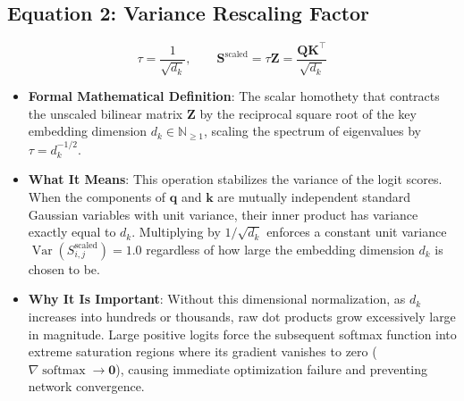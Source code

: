 \documentclass[11pt,a4paper]{article}
\theoremstyle{definition}
\begin{document}
\subsection{\textbf{Equation 2: Variance Rescaling Factor}}
{\boldmath
\begin{equation}
\tau = \frac{1}{\sqrt{d_k}}, \qquad \mathbf{S}^{\text{scaled}} = \tau \mathbf{Z} = \frac{\mathbf{Q}\mathbf{K}^\top}{\sqrt{d_k}}
\end{equation}
}
\begin{itemize}
    \item \textbf{Formal Mathematical Definition}:
    The scalar homothety that contracts the unscaled bilinear matrix $\mathbf{Z}$ by the reciprocal square root of the key embedding dimension $d_k \in \mathbb{N}_{\ge 1}$, scaling the spectrum of eigenvalues by $\tau = d_k^{-1/2}$.
    \item \textbf{What It Means}:
    This operation stabilizes the variance of the logit scores. When the components of $\mathbf{q}$ and $\mathbf{k}$ are mutually independent standard Gaussian variables with unit variance, their inner product has variance exactly equal to $d_k$. Multiplying by $1/\sqrt{d_k}$ enforces a constant unit variance $\operatorname{Var}(S_{i, j}^{\text{scaled}}) = 1.0$ regardless of how large the embedding dimension $d_k$ is chosen to be.
    \item \textbf{Why It Is Important}:
    Without this dimensional normalization, as $d_k$ increases into hundreds or thousands, raw dot products grow excessively large in magnitude. Large positive logits force the subsequent softmax function into extreme saturation regions where its gradient vanishes to zero ($\nabla \operatorname{softmax} \to \mathbf{0}$), causing immediate optimization failure and preventing network convergence.
\end{itemize}
\end{document}
